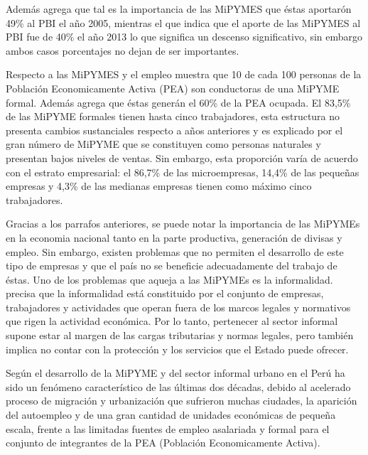 Además \cite{arbulu} agrega que tal es la importancia de las MiPYMES que éstas aportarón
49\% al PBI el año 2005, mientras el que \citep{produce} indica que el aporte
de las MiPYMES al PBI fue de 40\% el año 2013 lo que significa un descenso significativo,
sin embargo ambos casos porcentajes no dejan de ser importantes.

Respecto a las MiPYMES y el empleo \cite{produce2} muestra que 10 de cada 100 personas
de la Población Economicamente Activa (PEA) son conductoras de una MiPYME formal.
Además agrega que éstas generán el 60\% de la PEA ocupada. El 83,5\% de las
MiPYME formales tienen hasta cinco trabajadores, esta estructura no presenta cambios
sustanciales respecto a años anteriores y es explicado por el gran número de
MiPYME que se constituyen como personas naturales y presentan bajos niveles de
ventas. Sin embargo, esta proporción varía de acuerdo con el estrato empresarial:
el 86,7\% de las microempresas, 14,4\% de las pequeñas empresas y 4,3\% de las
medianas empresas tienen como máximo cinco trabajadores.

Gracias a los parrafos anteriores, se puede notar la importancia de las MiPYMEs en
la economia nacional tanto en la parte productiva, generación de divisas y empleo.
Sin embargo, existen problemas que no permiten el desarrollo de este tipo de empresas
y que el país no se beneficie adecuadamente del trabajo de éstas. Uno de los problemas que aqueja a
las MiPYMEs es la informalidad. \cite{loayza} precisa que la informalidad está
constituido por el conjunto de empresas, trabajadores y actividades que operan
fuera de los marcos legales y normativos que rigen la actividad económica. Por
lo tanto, pertenecer al sector informal supone estar al margen de las cargas
tributarias y normas legales, pero también implica no contar con la protección
y los servicios que el Estado puede ofrecer.

Según \cite{arbulu} el desarrollo de la MiPYME y del sector informal urbano
en el Perú ha sido un fenómeno característico de las últimas dos
décadas, debido al acelerado proceso de migración y urbanización que
sufrieron muchas ciudades, la aparición del autoempleo y de una gran cantidad
de unidades económicas de pequeña escala, frente a las limitadas fuentes
de empleo asalariada y formal para el conjunto de integrantes de la PEA (Población
Economicamente Activa).

